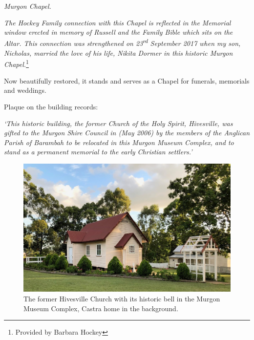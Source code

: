 \emph{Murgon Chapel.}



\emph{The Hockey Family connection with this Chapel is reflected in the Memorial window erected in memory of Russell and the Family Bible which sits on the Altar. This connection was strengthened on 23\textsuperscript{rd} September 2017 when my son, Nicholas, married the love of his life, Nikita Dormer in this historic Murgon Chapel.}\footnote{Provided by Barbara Hockey}


\medskip


Now beautifully restored, it stands and serves as a Chapel for funerals, memorials and weddings.



Plaque on the building records:



\emph{`This historic building, the former Church of the Holy Spirit, Hivesville, was gifted to the Murgon Shire Council in (May 2006) by the members of the Anglican Parish of Barambah to be relocated in this Murgon Museum Complex, and to stand as a permanent memorial to the early Christian settlers.'}









\begin{figure}[!htb]
\begin{center}
\includegraphics[width=1.\textwidth,center]{../images/hivesvilleChurchToday.jpg}
\caption{The former Hivesville Church with its historic bell in the Murgon Museum Complex, Castra home in the background.}
\end{center}
\end{figure}




